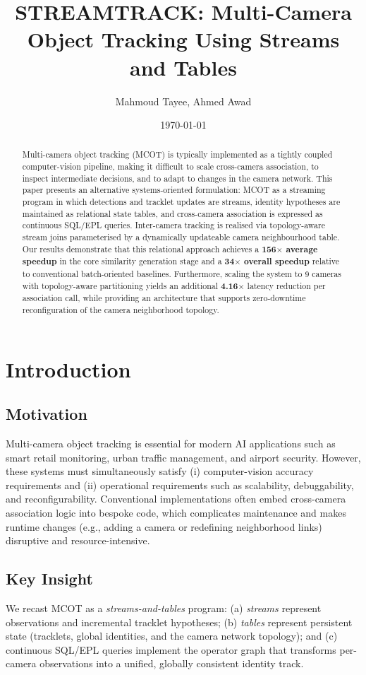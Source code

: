 \documentclass[11pt]{article}
\title{STREAMTRACK: Multi-Camera Object Tracking Using Streams and Tables}
\author{Mahmoud Tayee, Ahmed Awad}
\date{\today}
\begin{document}
\maketitle

\begin{abstract}
Multi-camera object tracking (MCOT) is typically implemented as a tightly coupled computer-vision pipeline, making it difficult to scale cross-camera association, to inspect intermediate decisions, and to adapt to changes in the camera network. This paper presents an alternative systems-oriented formulation: MCOT as a streaming program in which detections and tracklet updates are streams, identity hypotheses are maintained as relational state tables, and cross-camera association is expressed as continuous SQL/EPL queries. Inter-camera tracking is realised via topology-aware stream joins parameterised by a dynamically updateable camera neighbourhood table. Our results demonstrate that this relational approach achieves a \textbf{156$\times$ average speedup} in the core similarity generation stage and a \textbf{34$\times$ overall speedup} relative to conventional batch-oriented baselines. Furthermore, scaling the system to 9 cameras with topology-aware partitioning yields an additional \textbf{4.16$\times$} latency reduction per association call, while providing an architecture that supports zero-downtime reconfiguration of the camera neighborhood topology.
\end{abstract}

\section{Introduction}
\subsection{Motivation}
Multi-camera object tracking is essential for modern AI applications such as smart retail monitoring, urban traffic management, and airport security. However, these systems must simultaneously satisfy (i) computer-vision accuracy requirements and (ii) operational requirements such as scalability, debuggability, and reconfigurability. Conventional implementations often embed cross-camera association logic into bespoke code, which complicates maintenance and makes runtime changes (e.g., adding a camera or redefining neighborhood links) disruptive and resource-intensive.

\subsection{Key Insight}
We recast MCOT as a \emph{streams-and-tables} program: (a) \emph{streams} represent observations and incremental tracklet hypotheses; (b) \emph{tables} represent persistent state (tracklets, global identities, and the camera network topology); and (c) continuous SQL/EPL queries implement the operator graph that transforms per-camera observations into a unified, globally consistent identity track.
\end{document}
